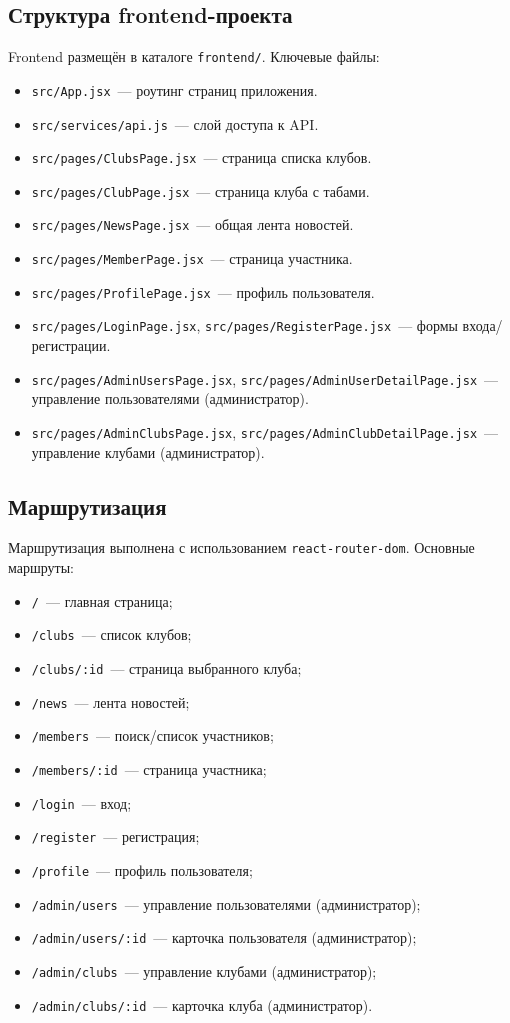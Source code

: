 \documentclass[utf8, russian]{eskdtext}
\begin{document}
\subsection{Структура frontend-проекта}
Frontend размещён в каталоге \texttt{frontend/}. Ключевые файлы:
\begin{itemize}
  \item \texttt{src/App.jsx}~--- роутинг страниц приложения.
  \item \texttt{src/services/api.js}~--- слой доступа к API.
  \item \texttt{src/pages/ClubsPage.jsx}~--- страница списка клубов.
  \item \texttt{src/pages/ClubPage.jsx}~--- страница клуба с табами.
  \item \texttt{src/pages/NewsPage.jsx}~--- общая лента новостей.
  \item \texttt{src/pages/MemberPage.jsx}~--- страница участника.
  \item \texttt{src/pages/ProfilePage.jsx}~--- профиль пользователя.
  \item \texttt{src/pages/LoginPage.jsx}, \texttt{src/pages/RegisterPage.jsx}~--- формы входа/регистрации.
  \item \texttt{src/pages/AdminUsersPage.jsx}, \texttt{src/pages/AdminUserDetailPage.jsx}~--- управление пользователями (администратор).
  \item \texttt{src/pages/AdminClubsPage.jsx}, \texttt{src/pages/AdminClubDetailPage.jsx}~--- управление клубами (администратор).
\end{itemize}

\subsection{Маршрутизация}
Маршрутизация выполнена с использованием \texttt{react-router-dom}. Основные маршруты:
\begin{itemize}
  \item \texttt{/}~--- главная страница;
  \item \texttt{/clubs}~--- список клубов;
  \item \texttt{/clubs/:id}~--- страница выбранного клуба;
  \item \texttt{/news}~--- лента новостей;
  \item \texttt{/members}~--- поиск/список участников;
  \item \texttt{/members/:id}~--- страница участника;
  \item \texttt{/login}~--- вход;
  \item \texttt{/register}~--- регистрация;
  \item \texttt{/profile}~--- профиль пользователя;
  \item \texttt{/admin/users}~--- управление пользователями (администратор);
  \item \texttt{/admin/users/:id}~--- карточка пользователя (администратор);
  \item \texttt{/admin/clubs}~--- управление клубами (администратор);
  \item \texttt{/admin/clubs/:id}~--- карточка клуба (администратор).
\end{itemize}
\end{document}
